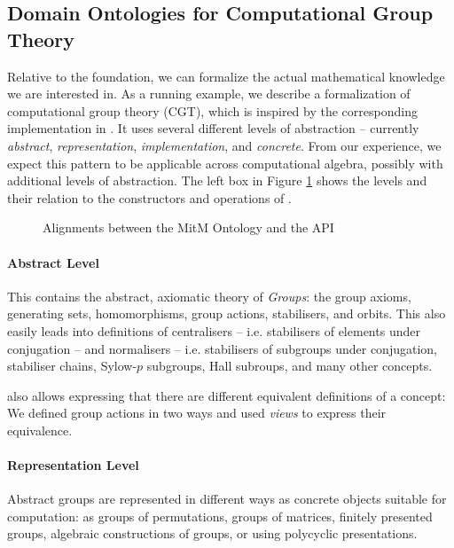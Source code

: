 \subsection{Domain Ontologies for Computational Group Theory}

Relative to the foundation, we can formalize the actual mathematical knowledge we are interested in.
As a running example, we describe a formalization of computational group theory (CGT), which is inspired by the corresponding implementation in \GAP.
It uses several different levels of abstraction -- currently \emph{abstract}, \emph{representation}, \emph{implementation}, and \emph{concrete}.
From our experience, we expect this pattern to be applicable across computational algebra, possibly with additional levels of abstraction. 
The left box in Figure \ref{fig:cgtontology} shows the levels and their relation to the constructors and operations of \GAP. 

\begin{figure}[ht]\centering
  \caption{Alignments between the MitM Ontology and the \GAP API}\label{fig:cgtontology}
\end{figure}

\paragraph{Abstract Level} This contains the abstract, axiomatic theory of \emph{Groups}: the group axioms, generating sets, homomorphisms, group actions, stabilisers, and orbits.
This also easily leads into definitions of centralisers -- i.e. stabilisers of elements under conjugation -- and normalisers -- i.e. stabilisers of subgroups under conjugation, stabiliser chains, Sylow-$p$ subgroups, Hall subroups, and many other concepts.

\OMMT also allows expressing that there are different equivalent definitions of a concept: We defined group actions in two ways and used \emph{views} to express their equivalence.

\paragraph{Representation Level} 
Abstract groups are represented in different ways as concrete objects suitable for computation: as groups of permutations, groups of matrices, finitely presented groups, algebraic constructions of groups, or using polycyclic presentations.

